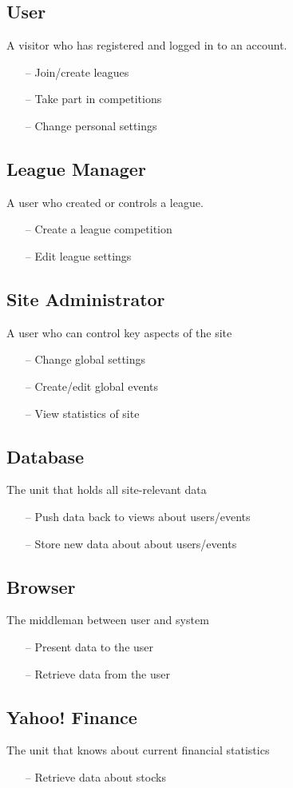 \subsection{User}
A visitor who has registered and logged in to an account.
\begin{itemize}
\item[--] Join/create leagues
\item[--] Take part in competitions
\item[--] Change personal settings
\end{itemize}
\subsection{League Manager}
A user who created or controls a league.
\begin{itemize}
\item[--] Create a league competition
\item[--] Edit league settings
\end{itemize}
\subsection{Site Administrator}
A user who can control key aspects of the site
\begin{itemize}
\item[--] Change global settings
\item[--] Create/edit global events
\item[--] View statistics of site
\end{itemize}
\subsection{Database}
The unit that holds all site-relevant data
\begin{itemize}
\item[--] Push data back to views about users/events
\item[--] Store new data about about users/events
\end{itemize}
\subsection{Browser}
The middleman between user and system
\begin{itemize}
\item[--] Present data to the user
\item[--] Retrieve data from the user
\end{itemize}
\subsection{Yahoo! Finance}
The unit that knows about current financial statistics
\begin{itemize}
\item[--] Retrieve data about stocks
\end{itemize}
